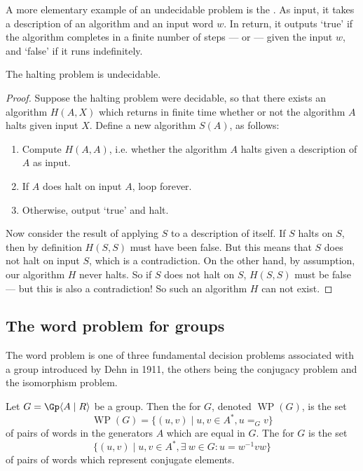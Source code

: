 \documentclass[noindex,noinsetproof,emphthm,12pt]{lmaths}
\DeclareMathOperator{\WP}{WP}
\begin{document}
A more elementary example of an undecidable problem is the . As input, it takes a description of an algorithm and an input word $w$. In return, it outputs `true' if the algorithm completes in a finite number of steps --- or  --- given the input $w$, and `false' if it runs indefinitely.

\begin{theorem}
	The halting problem is undecidable.
\end{theorem}
\begin{proof}
	Suppose the halting problem were decidable, so that there exists an algorithm $H(A, X)$ which returns in finite time whether or not the algorithm $A$ halts given input $X$. Define a new algorithm $S(A)$, as follows: 
	\begin{enumerate}	
		\item Compute $H(A, A)$, i.e. whether the algorithm $A$ halts given a description of $A$ as input.
		\item If $A$ does halt on input $A$, loop forever.
		\item Otherwise, output `true' and halt.
	\end{enumerate}

	Now consider the result of applying $S$ to a description of itself. If $S$ halts on $S$, then by definition $H(S, S)$ must have been false. But this means that $S$ does not halt on input $S$, which is a contradiction. On the other hand, by assumption, our algorithm $H$ never halts. So if $S$ does not halt on $S$, $H(S, S)$ must be false --- but this is also a contradiction! So such an algorithm $H$ can not exist.
\end{proof}


\subsection{The word problem for groups} \label{sec:word-problem}

The word problem is one of three fundamental decision problems associated with a group introduced by Dehn \cite{Dehn1911} in 1911, the others being the conjugacy problem and the isomorphism problem.

\begin{defn}
	Let $G = \Gp \langle A \mid R \rangle$ be a group. Then the  for $G$, denoted $\WP(G)$, is the set
	\[ \WP(G) = \{ (u, v) \mid u, v \in A^*, u =_G v \} \]
	of pairs of words in the generators $A$ which are equal in $G$. The  for $G$ is the set
	\[ \{ (u, v) \mid u, v \in A^*, \exists\ w \in G \colon u = w^{-1}vw \} \]
	of pairs of words which represent conjugate elements.
\end{defn}
\end{document}
